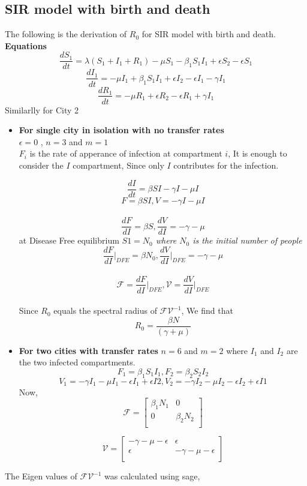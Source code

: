\documentclass{article}
\begin{document}
\subsection{SIR model with birth and death}
The following is the derivation of $R_{0}$ for SIR model with birth and death. \\
\textbf{Equations}
$$\frac{dS_{1}}{dt}=\lambda(S_{1}+I_{1}+R_{1}) -\mu  S_{1} - \beta_{1} S_{1}I_{1}  + \epsilon S_{2} -\epsilon S_{1} $$
$$\frac{dI_{1}}{dt}= -\mu  I_{1} + \beta_{1} S_{1}I_{1}  + \epsilon I_{2} -\epsilon I_{1} -\gamma I_{1} $$
$$\frac{dR_{1}}{dt}= -\mu  R_{1} +  \epsilon R_{2} -\epsilon R_{1} +\gamma I_{1} $$
Similarlly for City 2
\begin{itemize}

\item \textbf{For single city in isolation with no transfer rates}\\
  $\epsilon = 0$ , $n=3$ and $m=1$ \\ $F_{i}$ is the rate of
  apperance of infection at compartment $i$, It is enough to consider
  the $I$ compartment, Since only $I$ contributes for the infection.

  $$\frac{dI}{dt}= \beta S I -\gamma I -\mu I$$
  $$F=\beta S I,V= -\gamma I -\mu I$$\
  $$\frac{dF}{dI}=\beta S , \frac{dV}{dI}= -\gamma -\mu$$ 
  at Disease Free equilibrium \textit{$S1=N_{0}$ where $N_{0}$ is the initial number of people} \newline
  $$\frac{dF}{dI} \big|_{DFE}=\beta N_{0} , \frac{dV}{dI} \big|_{DFE}= -\gamma -\mu$$ \\
  $$\mathcal{F}=\frac{dF}{dI} \big|_{DFE},  \mathcal{V}=\frac{dV}{dI} \big|_{DFE}$$ \\
  Since $R_{0}$ equals the spectral radius of $\mathcal{F}\mathcal{V}^{-1}$, We find that
  $$R_{0}=\frac{\beta N}{(\gamma + \mu)}$$

\item \textbf{For two cities with transfer rates} \newline
  $n=6$ and $m=2$ where $I_{1}$ and $I_{2}$ are the two infected compartments.\newline
  $$F_{1} = \beta_{1} S_{1} I_{1} ,  F_{2} = \beta_{2} S_{2} I_{2}$$ 
  $$V_{1}=-\gamma I_{1} -\mu I_{1} -\epsilon I_{1} + \epsilon I{2},   V_{2}=-\gamma I_{2} -\mu I_{2} -\epsilon I_{2} + \epsilon I{1}$$ 
  Now,\\
  \center
    \[
\mathcal{F}=
  \begin{bmatrix}
    \beta_{1} N_{1} & 0 \\
    0 & \beta_{2} N_{2} \\
  \end{bmatrix}
\]
 
\[
\mathcal{V}=
  \begin{bmatrix}
    -\gamma -\mu - \epsilon & \epsilon \\
    \epsilon & -\gamma -\mu -\epsilon \\
  \end{bmatrix}
\]
\end{itemize}
The Eigen values of $\mathcal{F}\mathcal{V}^{-1}$ was calculated using sage,
\end{document}
